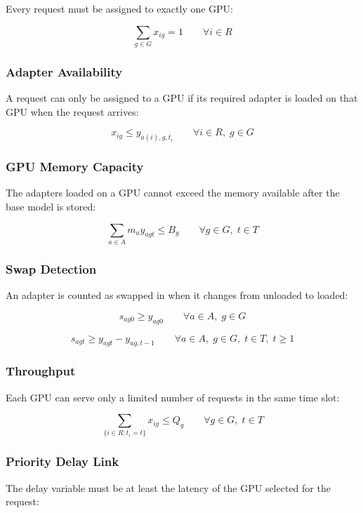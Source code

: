 \documentclass[12pt]{article}
\begin{document}
Every request must be assigned to exactly one GPU:

\[
\sum_{g \in G} x_{ig} = 1
\qquad \forall i \in R
\]

\subsubsection*{Adapter Availability}

A request can only be assigned to a GPU if its required adapter is loaded on
that GPU when the request arrives:

\[
x_{ig} \leq y_{a(i),g,t_i}
\qquad \forall i \in R,\; g \in G
\]

\subsubsection*{GPU Memory Capacity}

The adapters loaded on a GPU cannot exceed the memory available after the base
model is stored:

\[
\sum_{a \in A} m_a y_{agt} \leq B_g
\qquad \forall g \in G,\; t \in T
\]

\subsubsection*{Swap Detection}

An adapter is counted as swapped in when it changes from unloaded to loaded:

\[
s_{ag0} \geq y_{ag0}
\qquad \forall a \in A,\; g \in G
\]

\[
s_{agt} \geq y_{agt} - y_{ag,t-1}
\qquad \forall a \in A,\; g \in G,\; t \in T,\; t \geq 1
\]

\subsubsection*{Throughput}

Each GPU can serve only a limited number of requests in the same time slot:

\[
\sum_{\{i \in R: t_i = t\}} x_{ig} \leq Q_g
\qquad \forall g \in G,\; t \in T
\]

\subsubsection*{Priority Delay Link}

The delay variable must be at least the latency of the GPU selected for the
request:
\end{document}
